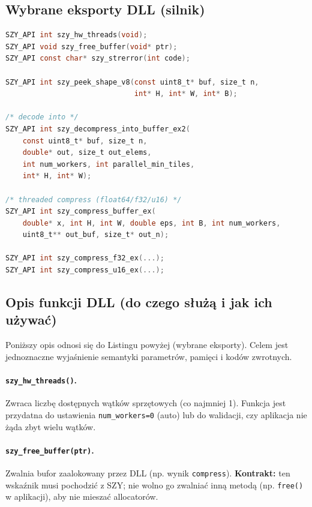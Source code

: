 \documentclass[11pt,a4paper]{article}
\begin{document}
\subsection{Wybrane eksporty DLL (silnik)}
\begin{lstlisting}[style=cstyle,language=C,caption={Wybrane funkcje DLL (include/szy\_dll.h)}]
SZY_API int szy_hw_threads(void);
SZY_API void szy_free_buffer(void* ptr);
SZY_API const char* szy_strerror(int code);

SZY_API int szy_peek_shape_v8(const uint8_t* buf, size_t n,
                              int* H, int* W, int* B);

/* decode into */
SZY_API int szy_decompress_into_buffer_ex2(
    const uint8_t* buf, size_t n,
    double* out, size_t out_elems,
    int num_workers, int parallel_min_tiles,
    int* H, int* W);

/* threaded compress (float64/f32/u16) */
SZY_API int szy_compress_buffer_ex(
    double* x, int H, int W, double eps, int B, int num_workers,
    uint8_t** out_buf, size_t* out_n);

SZY_API int szy_compress_f32_ex(...);
SZY_API int szy_compress_u16_ex(...);
\end{lstlisting}

\subsection{Opis funkcji DLL (do czego służą i jak ich używać)}
Poniższy opis odnosi się do Listingu powyżej (wybrane eksporty). Celem jest jednoznaczne wyjaśnienie semantyki parametrów, pamięci i kodów zwrotnych.

\paragraph{\texttt{szy\_hw\_threads()}.}
Zwraca liczbę dostępnych wątków sprzętowych (co najmniej 1). Funkcja jest przydatna do ustawienia \texttt{num\_workers=0} (auto) lub do walidacji, czy aplikacja nie żąda zbyt wielu wątków.

\paragraph{\texttt{szy\_free\_buffer(ptr)}.}
Zwalnia bufor zaalokowany przez DLL (np. wynik \texttt{compress}). \textbf{Kontrakt:} ten wskaźnik musi pochodzić z SZY; nie wolno go zwalniać inną metodą (np. \texttt{free()} w aplikacji), aby nie mieszać allocatorów.
\end{document}
